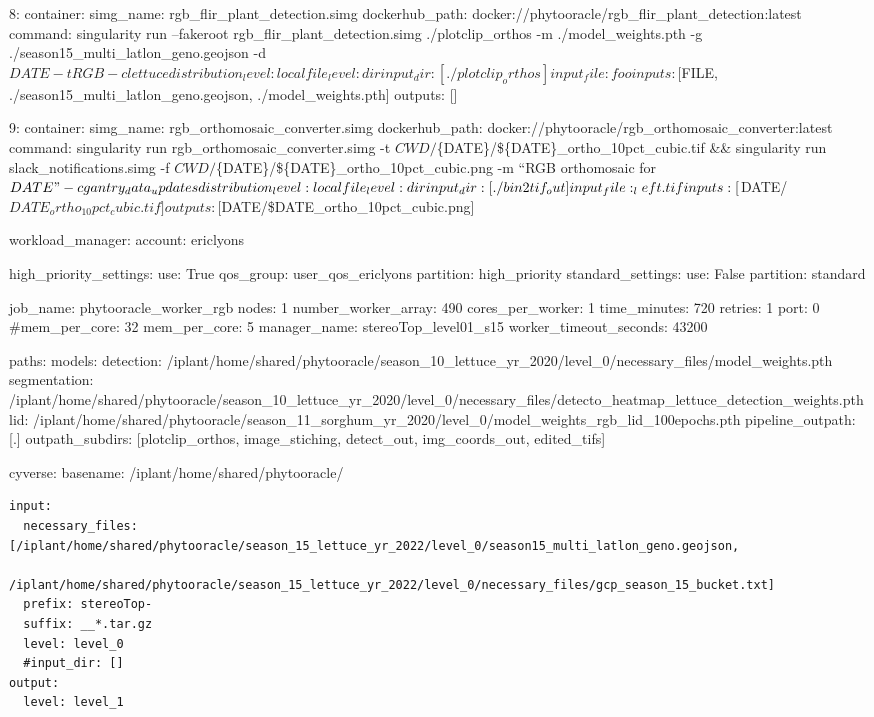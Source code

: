 \documentclass[
]{article}
\begin{document}
8: container: simg\_name: rgb\_flir\_plant\_detection.simg
dockerhub\_path: docker://phytooracle/rgb\_flir\_plant\_detection:latest
command: singularity run --fakeroot rgb\_flir\_plant\_detection.simg
./plotclip\_orthos -m ./model\_weights.pth -g
./season15\_multi\_latlon\_geno.geojson -d
\({DATE} -t RGB -c lettuce  distribution_level: local  file_level: dir  input_dir: [./plotclip_orthos]  input_file: foo  inputs: [\)FILE,
./season15\_multi\_latlon\_geno.geojson, ./model\_weights.pth{]}
outputs: {[}{]}

9: container: simg\_name: rgb\_orthomosaic\_converter.simg
dockerhub\_path: docker://phytooracle/rgb\_orthomosaic\_converter:latest
command: singularity run rgb\_orthomosaic\_converter.simg -t
\({CWD}/\)\{DATE\}/\$\{DATE\}\_ortho\_10pct\_cubic.tif \&\& singularity
run slack\_notifications.simg -f
\({CWD}/\)\{DATE\}/\$\{DATE\}\_ortho\_10pct\_cubic.png -m ``RGB
orthomosaic for
\({DATE}" -c gantry_data_updates  distribution_level: local  file_level: dir  input_dir: [./bin2tif_out]  input_file: _left.tif  inputs: [\)DATE/\(DATE_ortho_10pct_cubic.tif]  outputs: [\)DATE/\$DATE\_ortho\_10pct\_cubic.png{]}

workload\_manager: account: ericlyons

high\_priority\_settings: use: True qos\_group: user\_qos\_ericlyons
partition: high\_priority standard\_settings: use: False partition:
standard

job\_name: phytooracle\_worker\_rgb nodes: 1 number\_worker\_array: 490
cores\_per\_worker: 1 time\_minutes: 720 retries: 1 port: 0
\#mem\_per\_core: 32 mem\_per\_core: 5 manager\_name:
stereoTop\_level01\_s15 worker\_timeout\_seconds: 43200

paths: models: detection:
/iplant/home/shared/phytooracle/season\_10\_lettuce\_yr\_2020/level\_0/necessary\_files/model\_weights.pth
segmentation:
/iplant/home/shared/phytooracle/season\_10\_lettuce\_yr\_2020/level\_0/necessary\_files/detecto\_heatmap\_lettuce\_detection\_weights.pth
lid:
/iplant/home/shared/phytooracle/season\_11\_sorghum\_yr\_2020/level\_0/model\_weights\_rgb\_lid\_100epochs.pth
pipeline\_outpath: {[}.{]} outpath\_subdirs: {[}plotclip\_orthos,
image\_stiching, detect\_out, img\_coords\_out, edited\_tifs{]}

cyverse: basename: /iplant/home/shared/phytooracle/

\begin{verbatim}
input: 
  necessary_files: [/iplant/home/shared/phytooracle/season_15_lettuce_yr_2022/level_0/season15_multi_latlon_geno.geojson,
                    /iplant/home/shared/phytooracle/season_15_lettuce_yr_2022/level_0/necessary_files/gcp_season_15_bucket.txt]
  prefix: stereoTop-
  suffix: __*.tar.gz
  level: level_0
  #input_dir: []
output:
  level: level_1
\end{verbatim}
\end{document}
